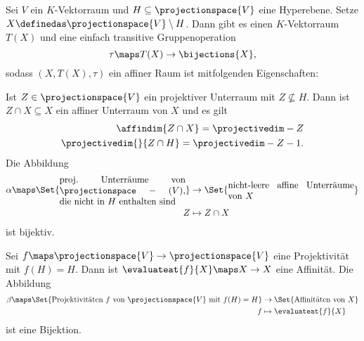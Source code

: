 \begin{satz}\label{projektiver_raum_als_affiner_raum}
  Sei \( V \) ein \( K \)-Vektorraum und \( H\subseteq \projectionspace{V} \) eine Hyperebene. Setze \( X\definedas \projectionspace{V}\setminus H\). Dann gibt es einen \( K \)-Vektorraum \( T(X) \) und eine einfach transitive Gruppenoperation
  \begin{equation*}
    \tau\maps T(X)\to \bijections{X},
  \end{equation*}
  sodass \( (X,T(X),\tau) \) ein affiner Raum ist mitfolgenden Eigenschaften:
  \begin{eigenschaftenenumerate}
    \item\label{projektive_unterraeume_in_affine_unterraeume} Ist \( Z\in \projectionspace{V} \) ein projektiver Unterraum mit \( Z\not\subseteq H \). Dann ist \( Z\cap X\subseteq X \) ein affiner Unterraum von \( X \) und es gilt
    \begin{align*}
      \affindim{Z\cap X}=\projectivedim-{Z}\\
      \projectivedim{}{Z\cap H}=\projectivedim-{Z}-1.
    \end{align*}
    Die Abbildung
    \begin{equation*}
      \begin{split}
      \alpha\maps \Set{\parbox{0.4\textwidth}{proj.\ Unterräume von \( \projectionspace-{(V)} \), die nicht in \( H \) enthalten sind}}&\to \Set{\parbox{0.4\textwidth}{nicht-leere affine Unterräume von \( X \)}}\\
      Z&\mapsto Z\cap X
      \end{split}
    \end{equation*}
    ist bijektiv.
    \item \label{projektivitaeten_in_affinitaeten} Sei \( f\maps \projectionspace{V}\to \projectionspace{V} \) eine Projektivität mit \( f(H)=H \). Dann ist \( \evaluateat{f}{X}\maps X\to X \) eine Affinität. Die Abbildung
    \begin{equation*}
      \begin{split}
        \beta\maps \Set{\text{Projektivitäten \( f \) von \( \projectionspace{V} \) mit \( f(H)=H \)}}&\to \Set{\text{Affinitäten von \( X \)}}\\
        f&\mapsto \evaluateat{f}{X}
      \end{split}
    \end{equation*}
    ist eine Bijektion.
  \end{eigenschaftenenumerate}
\end{satz}
